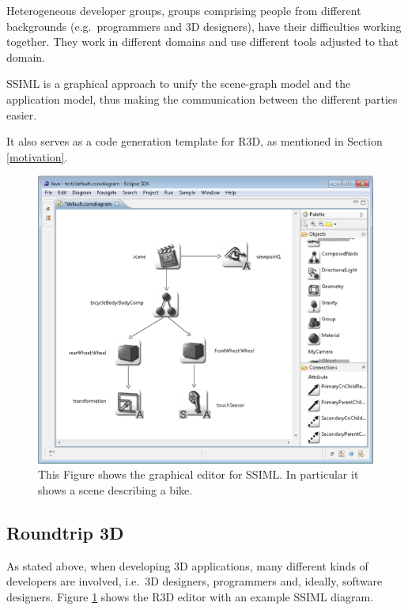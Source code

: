 Heterogeneous developer groups, groups comprising people from
different backgrounds (e.g.~programmers and \gls{3D} designers), have their difficulties
working together. They work in different domains and use different tools
adjusted to that domain. \cite{Glinz:2015:SUS:2802768.2802838}

SSIML is a graphical approach to unify the scene-graph model and the
application model, thus making the communication between the different
parties easier.

It also serves as a code generation template for \gls{R3D}, as mentioned in Section \ref{motivation}.

\begin{figure}
  \centering
  \includegraphics[width=12cm]{../assets/SSIML.png}
	\caption{This Figure shows the graphical editor for SSIML. In particular it shows a scene describing a bike. \cite{roundtrip3dwebsite}}
	\label{fig:ssimldiagram}
\end{figure}

\subsection{Roundtrip 3D}\label{roundtrip-3d}

As stated above, when developing \gls{3D} applications, many different kinds of
developers are involved, i.e.~\gls{3D} designers, programmers and, ideally,
software designers. Figure \ref{fig:ssimldiagram} shows the \gls{R3D} editor with an example \gls{SSIML} diagram.


